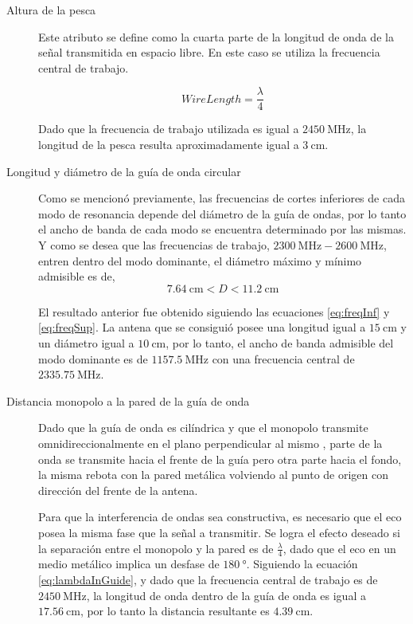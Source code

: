 \begin{description}
  \item[Altura de la pesca] Este atributo se define como la cuarta parte de la longitud de onda de la señal transmitida en espacio libre. En este caso se utiliza la frecuencia central de trabajo.

  \begin{equation}
  WireLength = \dfrac{\lambda}{4}
  \end{equation}

Dado que la frecuencia de trabajo utilizada es igual a $\SI{2450}{\MHz}$, la longitud de la pesca resulta aproximadamente igual a $\SI{3}{\centi\meter}$.

  \item[Longitud y diámetro de la guía de onda circular] Como se mencionó previamente, las frecuencias de cortes inferiores de cada modo de resonancia depende del diámetro de la guía de ondas, por lo tanto el ancho de banda de cada modo se encuentra determinado por las mismas. Y como se desea que las frecuencias de trabajo, $\SI{2300}{\MHz} - \SI{2600}{\MHz}$, entren dentro del modo dominante, el diámetro máximo y mínimo admisible es de,
  \begin{equation}
  \SI{7.64}{\centi\meter} < D < \SI{11.2}{\centi\meter}
  \end{equation}

  El resultado anterior fue obtenido siguiendo las ecuaciones \ref{eq:freqInf} y \ref{eq:freqSup}. La antena que se consiguió posee una longitud igual a $\SI{15}{\centi\meter}$ y un diámetro igual a $\SI{10}{\centi\meter}$, por lo tanto, el ancho de banda admisible del modo dominante es de $\SI{1157.5}{\MHz}$ con una frecuencia central de $\SI{2335.75}{\MHz}$.

  \item[Distancia monopolo a la pared de la guía de onda] Dado que la guía de onda es cilíndrica y que el monopolo transmite omnidireccionalmente en el plano perpendicular al mismo \cite{arrl2007}, parte de la onda se transmite hacia el frente de la guía pero otra parte hacia el fondo, la misma rebota con la pared metálica volviendo al punto de origen con dirección del frente de la antena.

  Para que la interferencia de ondas sea constructiva, es necesario que el eco posea la misma fase que la señal a transmitir. Se logra el efecto deseado si la separación entre el monopolo y la pared es de $\frac{\lambda}{4}$, dado que el eco en un medio metálico implica un desfase de $\SI{180}{\degree}$. Siguiendo la ecuación \ref{eq:lambdaInGuide}, y dado que la frecuencia central de trabajo es de $\SI{2450}{\MHz}$, la longitud de onda dentro de la guía de onda es igual a $\SI{17.56}{\centi\meter}$, por lo tanto la distancia resultante es $\SI{4.39}{\centi\meter}$.

\end{description}

